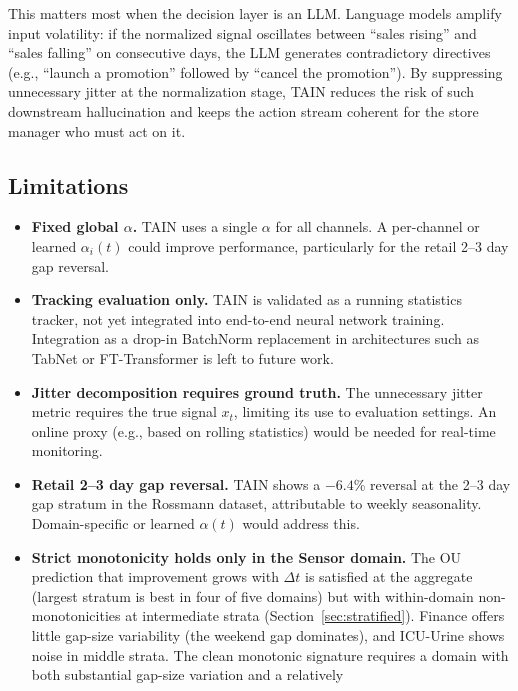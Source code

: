 \documentclass[11pt,a4paper]{article}
\begin{document}
This matters most when the decision layer is an LLM. Language models amplify
input volatility: if the normalized signal oscillates between ``sales rising''
and ``sales falling'' on consecutive days, the LLM generates contradictory
directives (e.g., ``launch a promotion'' followed by ``cancel the promotion'').
By suppressing unnecessary jitter at the normalization stage, TAIN reduces the
risk of such downstream hallucination and keeps the action stream coherent for
the store manager who must act on it.

\subsection{Limitations}

\begin{itemize}[leftmargin=1.5em,itemsep=2pt]
  \item \textbf{Fixed global $\alpha$.} TAIN uses a single $\alpha$ for all
    channels. A per-channel or learned $\alpha_i(t)$ could improve performance,
    particularly for the retail 2--3 day gap reversal.
  \item \textbf{Tracking evaluation only.} TAIN is validated as a running
    statistics tracker, not yet integrated into end-to-end neural network
    training. Integration as a drop-in BatchNorm replacement in architectures
    such as TabNet or FT-Transformer is left to future work.
  \item \textbf{Jitter decomposition requires ground truth.} The unnecessary
    jitter metric requires the true signal $x_t$, limiting its use to evaluation
    settings. An online proxy (e.g., based on rolling statistics) would be needed
    for real-time monitoring.
  \item \textbf{Retail 2--3 day gap reversal.} TAIN shows a $-6.4$\% reversal
    at the 2--3 day gap stratum in the Rossmann dataset, attributable to weekly
    seasonality. Domain-specific or learned $\alpha(t)$ would address this.
  \item \textbf{Strict monotonicity holds only in the Sensor domain.}
    The OU prediction that improvement grows with $\Delta t$ is satisfied at
    the aggregate (largest stratum is best in four of five domains) but with
    within-domain non-monotonicities at intermediate strata (Section~\ref{sec:stratified}).
    Finance offers little gap-size variability (the weekend gap dominates),
    and ICU-Urine shows noise in middle strata. The clean monotonic signature
    requires a domain with both substantial gap-size variation and a relatively

\end{itemize}
\end{document}
